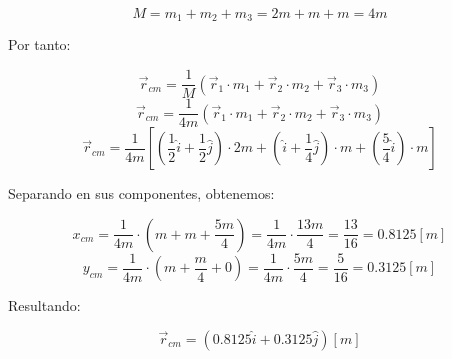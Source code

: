 \documentclass[letter,11pt]{article}
\begin{document}
\begin{equation*}
    M = m_1 + m_2 + m_3 = 2m + m + m = 4m
\end{equation*}

\vspace{0.5cm}
Por tanto:

\begin{equation*}
    \vec{r}_{cm} = \frac{1}{M} (\vec{r}_1 \cdot m_1 + \vec{r}_2 \cdot m_2 + \vec{r}_3 \cdot m_3)
\end{equation*}
\begin{equation*}
    \vec{r}_{cm} = \frac{1}{4m} (\vec{r}_1 \cdot m_1 + \vec{r}_2 \cdot m_2 + \vec{r}_3 \cdot m_3)
\end{equation*}
\begin{equation*}
    \vec{r}_{cm} = \frac{1}{4m} \left[ \left(\frac{1}{2} \hat{i} + \frac{1}{2} \hat{j}\right) \cdot 2m + \left(\hat{i}+\frac{1}{4} \hat{j}\right) \cdot m + \left(\frac{5}{4} \hat{i}\right) \cdot m \right]
\end{equation*}

\vspace{0.5cm}
Separando en sus componentes, obtenemos:

\begin{equation*}
    x_{cm} = \frac{1}{4m} \cdot \left(m + m + \frac{5m}{4}\right) = \frac{1}{4m} \cdot \frac{13m}{4} = \frac{13}{16} = 0.8125 [m]
\end{equation*}
\begin{equation*}
    y_{cm} = \frac{1}{4m} \cdot \left(m + \frac{m}{4} + 0\right) = \frac{1}{4m} \cdot \frac{5m}{4} = \frac{5}{16} = 0.3125 [m]
\end{equation*}

\vspace{0.5cm}
Resultando:

\begin{equation}
    \vec{r}_{cm} = (0.8125 \hat{i} + 0.3125 \hat{j}) [m]
\end{equation}
\end{document}
